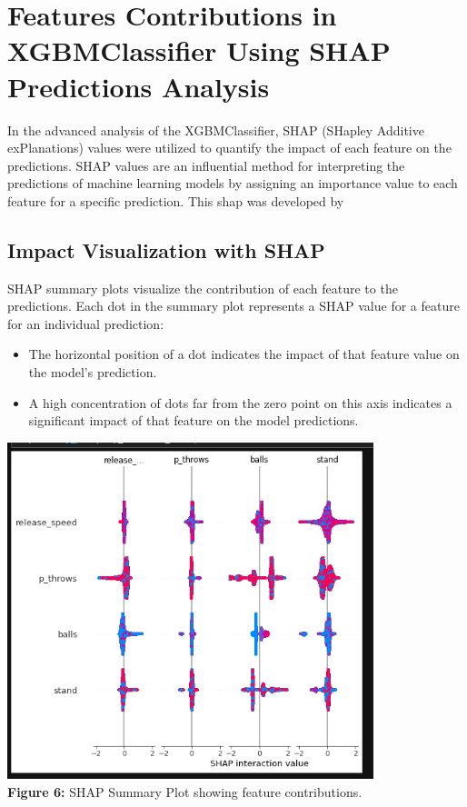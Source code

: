 \documentclass[12pt]{article}
\begin{document}
\maketitle

\section{Features Contributions in XGBMClassifier Using SHAP Predictions Analysis}
In the advanced analysis of the XGBMClassifier, SHAP (SHapley Additive exPlanations) values were utilized to quantify the impact of each feature on the predictions. SHAP values are an influential method for interpreting the predictions of machine learning models by assigning an importance value to each feature for a specific prediction. This shap was developed by \cite{Lundberg2020}

\subsection*{Impact Visualization with SHAP}
SHAP summary plots visualize the contribution of each feature to the predictions. Each dot in the summary plot represents a SHAP value for a feature for an individual prediction:
\begin{itemize}
    \item The horizontal position of a dot indicates the impact of that feature value on the model's prediction.
    \item A high concentration of dots far from the zero point on this axis indicates a significant impact of that feature on the model predictions.
\end{itemize}

\begin{center}
    \includegraphics[width=0.8\textwidth]{shapPred.png} %
    \textbf{\\Figure 6:} SHAP Summary Plot showing feature contributions.
\end{center}
\end{document}

